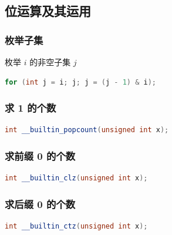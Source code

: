 \documentclass{article}
\begin{document}
\subsection{位运算及其运用}

\subsubsection{枚举子集}

枚举 $i$ 的非空子集 $j$

\begin{lstlisting}[language=C++]
for (int j = i; j; j = (j - 1) & i);
\end{lstlisting}

\subsubsection{求 1 的个数}

\begin{lstlisting}[language=C++]
int __builtin_popcount(unsigned int x);
\end{lstlisting}

\subsubsection{求前缀 0 的个数}

\begin{lstlisting}[language=C++]
int __builtin_clz(unsigned int x);
\end{lstlisting}

\subsubsection{求后缀 0 的个数}

\begin{lstlisting}[language=C++]
int __builtin_ctz(unsigned int x);
\end{lstlisting}
\end{document}
